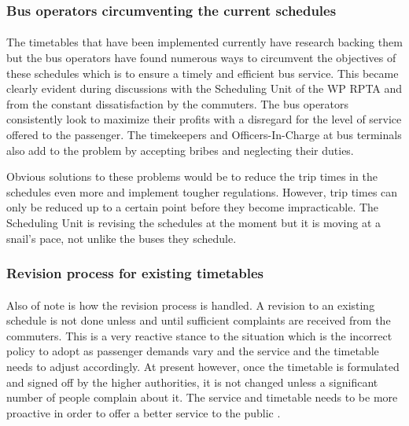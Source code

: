 \subsubsection{Bus operators circumventing the current schedules} 

\paragraph{} The timetables that have been implemented currently have research backing them but the bus operators have found numerous ways to circumvent the objectives of these schedules which is to ensure a timely and efficient bus service. This became clearly evident during discussions with the Scheduling Unit of the WP RPTA and from the constant dissatisfaction by the commuters. The bus operators consistently look to maximize their profits with a disregard for the level of service offered to the passenger. The timekeepers and Officers-In-Charge at bus terminals also add to the problem by accepting bribes and neglecting their duties.

Obvious solutions to these problems would be to reduce the trip times in the schedules even more and implement tougher regulations. However, trip times can only be reduced up to a certain point before they become impracticable. The Scheduling Unit is revising the schedules at the moment but it is moving at a snail's pace, not unlike the buses they schedule. 

\subsubsection{Revision process for existing timetables} 

\paragraph{} Also of note is how the revision process is handled. A revision to an existing schedule is not done unless and until sufficient complaints are received from the commuters. This is a very reactive stance to the situation which is the incorrect policy to adopt as passenger demands vary and the service and the timetable needs to adjust accordingly. At present however, once the timetable is formulated and signed off by the higher authorities, it is not changed unless a significant number of people complain about it. The service and timetable needs to be more proactive in order to offer a better service to the public \cite{Mahesh2013a, Theja2013a, Mahesh2013b, Navaratne2013a, Navaratne2013b, Ranjith2013a}.

